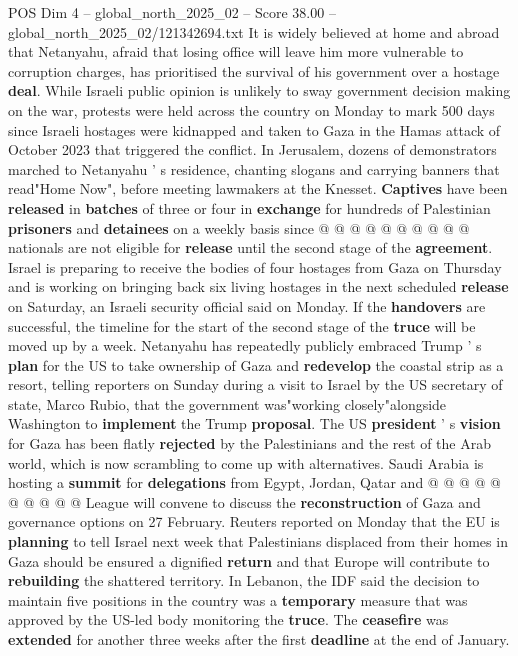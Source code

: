 \begin{textsample}{POS Dim 4 – global\_north\_2025\_02 – Score 38.00 – global\_north\_2025\_02/121342694.txt}
It is widely believed at home and abroad that Netanyahu, afraid that losing office will leave him more vulnerable to corruption charges, has prioritised the survival of his government over a hostage \textbf{deal}.
While Israeli public opinion is unlikely to sway government decision making on the war, protests were held across the country on Monday to mark 500 days since Israeli hostages were kidnapped and taken to Gaza in the Hamas attack of October 2023 that triggered the conflict.
In Jerusalem, dozens of demonstrators marched to Netanyahu ' s residence, chanting slogans and carrying banners that read"Home Now", before meeting lawmakers at the Knesset. \textbf{Captives} have been \textbf{released} in \textbf{batches} of three or four in \textbf{exchange} for hundreds of Palestinian \textbf{prisoners} and \textbf{detainees} on a weekly basis since @ @ @ @ @ @ @ @ @ @ nationals are not eligible for \textbf{release} until the second stage of the \textbf{agreement}.
Israel is preparing to receive the bodies of four hostages from Gaza on Thursday and is working on bringing back six living hostages in the next scheduled \textbf{release} on Saturday, an Israeli security official said on Monday.
If the \textbf{handovers} are successful, the timeline for the start of the second stage of the \textbf{truce} will be moved up by a week.
Netanyahu has repeatedly publicly embraced Trump ' s \textbf{plan} for the US to take ownership of Gaza and \textbf{redevelop} the coastal strip as a resort, telling reporters on Sunday during a visit to Israel by the US secretary of state, Marco Rubio, that the government was"working closely"alongside Washington to \textbf{implement} the Trump \textbf{proposal}.
The US \textbf{president} ' s \textbf{vision} for Gaza has been flatly \textbf{rejected} by the Palestinians and the rest of the Arab world, which is now scrambling to come up with alternatives.
Saudi Arabia is hosting a \textbf{summit} for \textbf{delegations} from Egypt, Jordan, Qatar and @ @ @ @ @ @ @ @ @ @ League will convene to discuss the \textbf{reconstruction} of Gaza and governance options on 27 February.
Reuters reported on Monday that the EU is \textbf{planning} to tell Israel next week that Palestinians displaced from their homes in Gaza should be ensured a dignified \textbf{return} and that Europe will contribute to \textbf{rebuilding} the shattered territory.
In Lebanon, the IDF said the decision to maintain five positions in the country was a \textbf{temporary} measure that was approved by the US-led body monitoring the \textbf{truce}.
The \textbf{ceasefire} was \textbf{extended} for another three weeks after the first \textbf{deadline} at the end of January.

\end{textsample}
